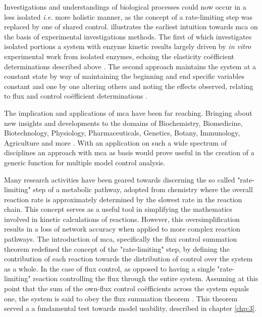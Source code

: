 Investigations and understandings of biological processes could now occur in a less isolated \textit{i.e.} more holistic manner, as the concept of a rate-limiting step was replaced by one of shared control. \citeauthor{Kacser1968} illustrates the earliest intuition towards \gls{mca} on the basis of experimental investigations methods. The first of which investigates isolated portions a system with enzyme kinetic results largely driven by \textit{in vitro} experimental work from isolated enzymes, echoing the elasticity co\"efficient determinations described above \citep{Hynne2001, Boren2002}. The second approach maintains the system at a constant state by way of maintaining the beginning and end specific variables constant and one by one altering others and noting the effects observed, relating to flux and control co\"efficient determinations \citep{Kacser1968}.

The implication and applications of \gls{mca} have been far reaching. Bringing about new insights and developments to the domains of Biochemistry, Biomedicine, Biotechnology, Physiology, Pharmaceuticals, Genetics, Botany, Immunology, Agriculture and more \citep{Kacser1981, Sorribas1995, Holms1996, Cornish1999, Boren2002, Cascante2002, Olivier2004, Weselake2008}. With an application on such a wide spectrum of disciplines an approach with \gls{mca} as basis would prove useful in the creation of a generic function for multiple model control analysis.  

Many research activities have been geared towards discerning the so called "rate-limiting" step of a metabolic pathway, adopted from chemistry where the overall reaction rate is approximately determined by the slowest rate in the reaction chain. This concept serves as a useful tool in simplifying the mathematics involved in kinetic calculations of reactions. However, this oversimplification results in a loss of network accuracy when applied to more complex reaction pathways. The introduction of \gls{mca}, specifically the flux control summation theorem redefined the concept of the "rate-limiting" step, by defining the contribution of each reaction towards the distribution of control over the system as a whole. In the case of flux control, as opposed to having a single "rate-limiting" reaction controlling the flux through the entire system. Assuming at this point that the sum of the own-flux control co\"efficients across the system equals one, the system is said to obey the flux summation theorem \citep{Fell1992,Hofmeyr2001,Kacser1995,Ehlde1997}. This theorem served a a fundamental test towards model usability, described in chapter \ref{chp:3}.

